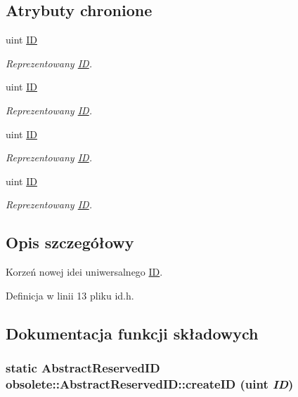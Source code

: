 \subsection*{Atrybuty chronione}
\begin{DoxyCompactItemize}
\item 
uint \hyperlink{classobsolete_1_1AbstractID_a5f67fa1c7d96085f0ef41193b60b570c}{ID}
\begin{DoxyCompactList}\small\item\em Reprezentowany \hyperlink{classobsolete_1_1ID}{ID}. \item\end{DoxyCompactList}\item 
uint \hyperlink{classobsolete_1_1AbstractID_a5f67fa1c7d96085f0ef41193b60b570c}{ID}
\begin{DoxyCompactList}\small\item\em Reprezentowany \hyperlink{classobsolete_1_1ID}{ID}. \item\end{DoxyCompactList}\item 
uint \hyperlink{classobsolete_1_1AbstractID_a5f67fa1c7d96085f0ef41193b60b570c}{ID}
\begin{DoxyCompactList}\small\item\em Reprezentowany \hyperlink{classobsolete_1_1ID}{ID}. \item\end{DoxyCompactList}\item 
uint \hyperlink{classobsolete_1_1AbstractID_a5f67fa1c7d96085f0ef41193b60b570c}{ID}
\begin{DoxyCompactList}\small\item\em Reprezentowany \hyperlink{classobsolete_1_1ID}{ID}. \item\end{DoxyCompactList}\end{DoxyCompactItemize}


\subsection{Opis szczegółowy}
Korzeń nowej idei uniwersalnego \hyperlink{classobsolete_1_1ID}{ID}. 

Definicja w linii 13 pliku id.h.



\subsection{Dokumentacja funkcji składowych}
\hypertarget{classobsolete_1_1AbstractReservedID_a38fa00bf6097ab9cff285c8480c8097e}{
\subsubsection[{createID}]{\setlength{\rightskip}{0pt plus 5cm}static {\bf AbstractReservedID} obsolete::AbstractReservedID::createID (uint {\em ID})}}
\label{classobsolete_1_1AbstractReservedID_a38fa00bf6097ab9cff285c8480c8097e}


